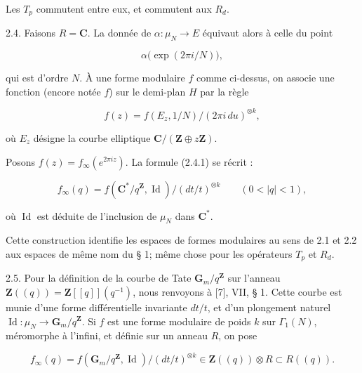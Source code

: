 \documentclass[10pt,oneside]{article}
\begin{document}
Les \(T_p\) commutent entre eux, et commutent aux \(R_d\).\par

2.4. Faisons \(R=\mathbf{C}\). La donnée de \(\alpha:\mu_N\longrightarrow E\) équivaut alors à celle du point\par

\begin{equation*}
\alpha\bigl(\exp(2\pi i/N)\bigr),
\end{equation*}

qui est d'ordre \(N\). À une forme modulaire \(f\) comme ci-dessus, on associe une fonction (encore notée \(f\)) sur le demi-plan \(H\) par la règle\par

\begin{equation*}
\tag{2.4.1}
f(z)=f(E_z,1/N)/(2\pi i\,du)^{\otimes k},
\end{equation*}

où \(E_z\) désigne la courbe elliptique \(\mathbf{C}/(\mathbf{Z}\oplus z\mathbf{Z})\).\par

Posons \(f(z)=f_\infty(e^{2\pi iz})\). La formule (2.4.1) se récrit :\par

\begin{equation*}
\tag{2.4.2}
f_\infty(q)=f(\mathbf{C}^*/q^{\mathbf{Z}},\operatorname{Id})/(dt/t)^{\otimes k}
\qquad(0<|q|<1),
\end{equation*}

où \(\operatorname{Id}\) est déduite de l'inclusion de \(\mu_N\) dans \(\mathbf{C}^*\).\par

Cette construction identifie les espaces de formes modulaires au sens de 2.1 et 2.2 aux espaces de même nom du § 1; même chose pour les opérateurs \(T_p\) et \(R_d\).\par

2.5. Pour la définition de la courbe de Tate \(\mathbf{G}_m/q^{\mathbf{Z}}\) sur l'anneau \(\mathbf{Z}((q))=\mathbf{Z}[[q]](q^{-1})\), nous renvoyons à [7], VII, § 1. Cette courbe est munie d'une forme différentielle invariante \(dt/t\), et d'un plongement naturel \(\operatorname{Id}:\mu_N\longrightarrow\mathbf{G}_m/q^{\mathbf{Z}}\). Si \(f\) est une forme modulaire de poids \(k\) sur \(\Gamma_1(N)\), méromorphe à l'infini, et définie sur un anneau \(R\), on pose\par

\begin{equation*}
f_\infty(q)=f(\mathbf{G}_m/q^{\mathbf{Z}},\operatorname{Id})/(dt/t)^{\otimes k}
\in\mathbf{Z}((q))\otimes R\subset R((q)).
\end{equation*}
\end{document}

